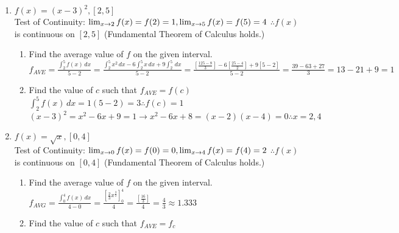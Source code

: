 \documentclass[10pt, letterpaper]{report}
\begin{document}
\begin{enumerate}
  \item{$f(x)=(x-3)^{2}, [2,5]$} \\

    Test of Continuity:
    $\lim_{x \to 2}f(x)=f(2)=1,
    \lim_{x \to 5}f(x)=f(5)=4\\$
    $\therefore f(x)$ is continuous on $[2,5]$ (Fundamental Theorem of Calculus holds.) \\

    \begin{enumerate}
      \item{Find the average value of $f$ on the given interval.} \\

        $f_{AVE}=\frac{\int_{2}^{5}{f(x)}\,dx}{5-2}=
          \frac{\int_{2}^{5}{x^{2}}\,dx-6\int_{2}^{5}{x}\,dx+9\int_{2}^{5}\,dx}{5-2}=
          \frac{[\frac{125-8}{3}]-6[\frac{25-4}{2}]+9[5-2]}{5-2}=
          \frac{39-63+27}{3}=13-21+9=1$ \\

      \item{Find the value of $c$ such that $f_{AVE}=f(c)$} \\

        $\int_{2}^{5}{f(x)}\,dx=1(5-2)=3\therefore f(c)=1$ \\

        $(x-3)^{2}=x^{2}-6x+9=1\rightarrow
        x^2-6x+8=(x-2)(x-4)=0\therefore x=2,4$ \\

    \end{enumerate}
  \item{$f(x)=\sqrt{x}, [0,4]$} \\

    Test of Continuity:
    $\lim_{x \to 0}f(x)=f(0)=0,
    \lim_{x \to 4}f(x)=f(4)=2\\$
    $\therefore f(x)$ is continuous on $[0,4]$ (Fundamental Theorem of Calculus holds.) \\
    \begin{enumerate}
      \item{Find the average value of $f$ on the given interval.} \\

        $f_{AVG}=\frac{\int_{0}^{4}{f(x)}\,dx}{4-0}=
        \frac{[\frac{2}{3}x^{\frac{3}{2}}]_{0}^{4}}{4}=
        \frac{[\frac{16}{3}]}{4}=\frac{4}{3}\approx1.333$ \\

      \item{Find the value of $c$ such that $f_{AVE}=f_{c}$} \\


\end{enumerate}
\end{enumerate}
\end{document}
